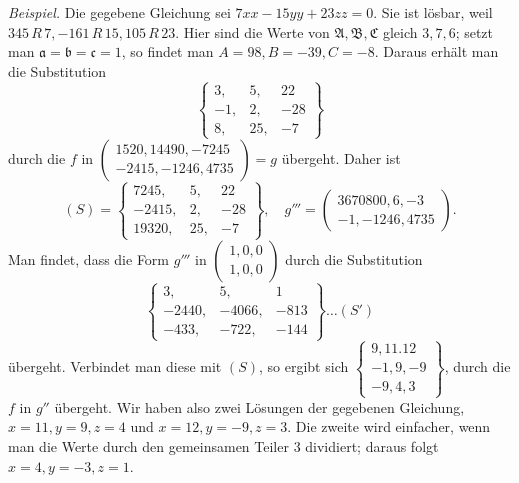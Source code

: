 \emph{Beispiel.} Die gegebene Gleichung sei \(7xx-15yy+23zz=0\). Sie ist
lösbar, weil \(345\,R\,7,-161\,R\,15,105\,R\,23\). Hier sind die Werte von \(\mathfrak A,\mathfrak B,\mathfrak C\) gleich
\(3,7,6\); setzt man \(\mathfrak a=\mathfrak b=\mathfrak c=1\), so findet man \(A=98,B=-39,C=-8\). Daraus
erhält man die Substitution
\[
\left\{\begin{array}{rrr}3,&5,&22\\-1,&2,&-28\\8,&25,&-7\end{array}\right\}
\]
durch die \(f\) in \(\left(\begin{smallmatrix}1520,14490,-7245\\-2415,-1246,4735\end{smallmatrix}\right)=g\) übergeht. Daher ist
\[
(S)=\left\{\begin{array}{rrr}7245,&5,&22\\-2415,&2,&-28\\19320,&25,&-7\end{array}\right\},\quad
g'''=\left(\begin{smallmatrix}3670800,6,-3\\-1,-1246,4735\end{smallmatrix}\right).
\]
Man findet, dass die Form \(g'''\) in \(\left(\begin{smallmatrix}1,0,0\\1,0,0\end{smallmatrix}\right)\) durch die Substitution
\[
\left\{\begin{array}{rrr}3,&5,&1\\-2440,&-4066,&-813\\-433,&-722,&-144\end{array}\right\}\ldots(S')
\]
übergeht. Verbindet man diese mit \((S)\), so
ergibt sich \(\left\{\begin{smallmatrix}9,11.12\\-1,9,-9\\-9,4,3\end{smallmatrix}\right\}\), durch die \(f\) in \(g''\) übergeht.
Wir haben also zwei Lösungen der gegebenen Gleichung, \(x=11,y=9,z=4\)
und \(x=12,y=-9,z=3\). Die zweite wird einfacher, wenn man die Werte
durch den gemeinsamen Teiler \(3\) dividiert; daraus folgt
\(x=4,y=-3,z=1\).


